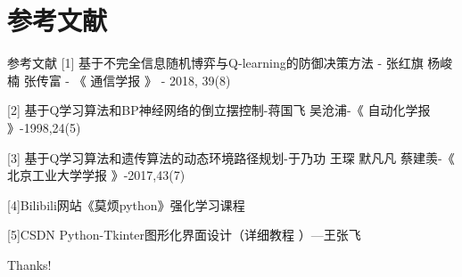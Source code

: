 \documentclass{beamer}
\begin{document}
\section{参考文献}

\begin{frame}{参考文献}
    [1] 基于不完全信息随机博弈与Q-learning的防御决策方法 - 张红旗 杨峻楠 张传富 - 《 通信学报 》 - 2018, 39(8)
    
    [2] 基于Q学习算法和BP神经网络的倒立摆控制-蒋国飞 吴沧浦-《 自动化学报 》-1998,24(5)
    
    [3] 基于Q学习算法和遗传算法的动态环境路径规划-于乃功 王琛 默凡凡 蔡建羡-《 北京工业大学学报 》-2017,43(7)
    
    [4]Bilibili网站《莫烦python》强化学习课程
    
    [5]CSDN Python-Tkinter图形化界面设计（详细教程 ）—王张飞
\end{frame}



\begin{frame}
    \begin{center}
        {\Huge\calligra Thanks!}
    \end{center}
\end{frame}
\end{document}
